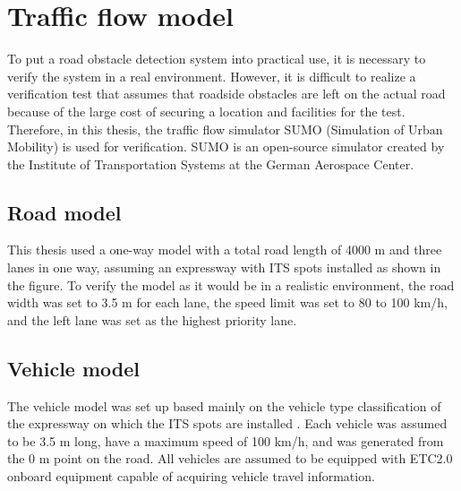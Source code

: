 \documentclass[paper]{ieice}
\begin{document}
\section{Traffic flow model}
\label{sec:traffic_flow_model}
%
To put a road obstacle detection system into practical use, it is necessary to verify the system in a real environment.
%
However, it is difficult to realize a verification test that assumes that roadside obstacles are left on the actual road because of the large cost of securing a location and facilities for the test.
%
Therefore, in this thesis, the traffic flow simulator SUMO (Simulation of Urban Mobility) \cite{sumo} is used for verification.
%
SUMO is an open-source simulator created by the Institute of Transportation Systems at the German Aerospace Center.
%
\subsection{Road model}
\label{sec:road_model}
%
This thesis used a one-way model with a total road length of 4000 m and three lanes in one way, assuming an expressway with ITS spots installed as shown in the figure.
%
To verify the model as it would be in a realistic environment, the road width was set to 3.5 m for each lane, the speed limit was set to 80 to 100 km/h, and the left lane was set as the highest priority lane.
%
\subsection{Vehicle model}
\label{sec:vehicle_model}
%
The vehicle model was set up based mainly on the vehicle type classification of the expressway on which the ITS spots are installed \cite{syasyukubun}.
%
Each vehicle was assumed to be 3.5 m long, have a maximum speed of 100 km/h, and was generated from the 0 m point on the road.
%
All vehicles are assumed to be equipped with ETC2.0 onboard equipment capable of acquiring vehicle travel information.
%
\end{document}
